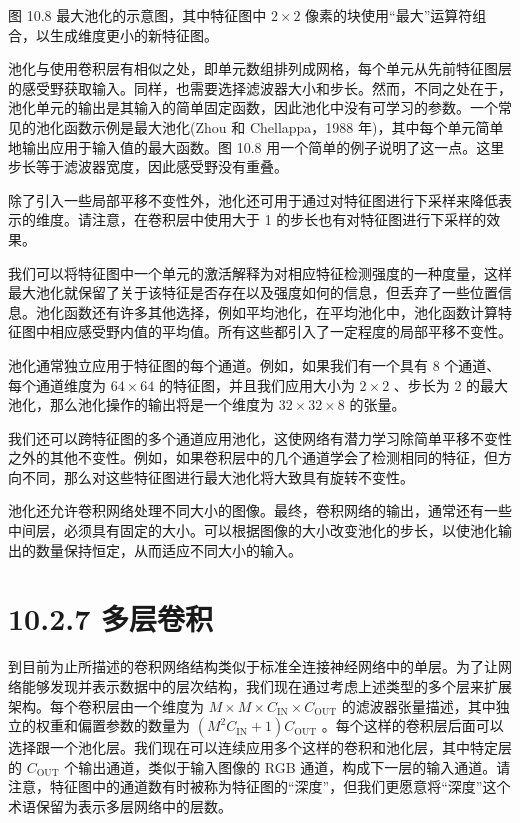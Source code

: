 \documentclass[10pt]{report}
\begin{document}
图 10.8 最大池化的示意图，其中特征图中 \(2 \times  2\) 像素的块使用“最大”运算符组合，以生成维度更小的新特征图。

池化与使用卷积层有相似之处，即单元数组排列成网格，每个单元从先前特征图层的感受野获取输入。同样，也需要选择滤波器大小和步长。然而，不同之处在于，池化单元的输出是其输入的简单固定函数，因此池化中没有可学习的参数。一个常见的池化函数示例是最大池化(Zhou 和 Chellappa，1988 年)，其中每个单元简单地输出应用于输入值的最大函数。图 10.8 用一个简单的例子说明了这一点。这里步长等于滤波器宽度，因此感受野没有重叠。

除了引入一些局部平移不变性外，池化还可用于通过对特征图进行下采样来降低表示的维度。请注意，在卷积层中使用大于 1 的步长也有对特征图进行下采样的效果。

我们可以将特征图中一个单元的激活解释为对相应特征检测强度的一种度量，这样最大池化就保留了关于该特征是否存在以及强度如何的信息，但丢弃了一些位置信息。池化函数还有许多其他选择，例如平均池化，在平均池化中，池化函数计算特征图中相应感受野内值的平均值。所有这些都引入了一定程度的局部平移不变性。

池化通常独立应用于特征图的每个通道。例如，如果我们有一个具有 8 个通道、每个通道维度为 \({64} \times  {64}\) 的特征图，并且我们应用大小为 \(2 \times  2\) 、步长为 2 的最大池化，那么池化操作的输出将是一个维度为 \({32} \times  {32} \times  8\) 的张量。

我们还可以跨特征图的多个通道应用池化，这使网络有潜力学习除简单平移不变性之外的其他不变性。例如，如果卷积层中的几个通道学会了检测相同的特征，但方向不同，那么对这些特征图进行最大池化将大致具有旋转不变性。

池化还允许卷积网络处理不同大小的图像。最终，卷积网络的输出，通常还有一些中间层，必须具有固定的大小。可以根据图像的大小改变池化的步长，以使池化输出的数量保持恒定，从而适应不同大小的输入。

\section*{10.2.7 多层卷积}

到目前为止所描述的卷积网络结构类似于标准全连接神经网络中的单层。为了让网络能够发现并表示数据中的层次结构，我们现在通过考虑上述类型的多个层来扩展架构。每个卷积层由一个维度为 \(M \times  M \times  {C}_{\mathrm{{IN}}} \times  {C}_{\mathrm{{OUT}}}\) 的滤波器张量描述，其中独立的权重和偏置参数的数量为 \(\left( {{M}^{2}{C}_{\mathrm{{IN}}} + 1}\right) {C}_{\mathrm{{OUT}}}\) 。每个这样的卷积层后面可以选择跟一个池化层。我们现在可以连续应用多个这样的卷积和池化层，其中特定层的 \({C}_{\mathrm{{OUT}}}\) 个输出通道，类似于输入图像的 RGB 通道，构成下一层的输入通道。请注意，特征图中的通道数有时被称为特征图的“深度”，但我们更愿意将“深度”这个术语保留为表示多层网络中的层数。
\end{document}
